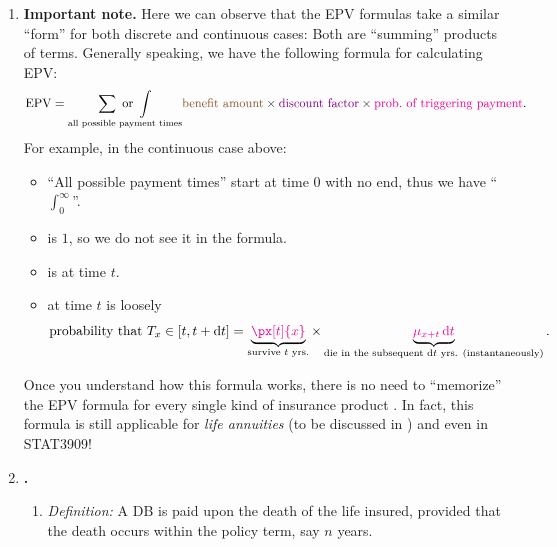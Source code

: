 \begin{enumerate}
\begin{enumerate}[label={(\arabic*)}]
\begin{center}
\begin{tabular}{lll}
\bottomrule
\end{tabular}
\end{center}
\end{enumerate}
\item \label{it:gen-epv-fmla} \ystar{} \textbf{Important note.} Here we can
observe that the EPV formulas take a similar ``form'' for both discrete and
continuous cases: Both are ``summing'' products of terms. Generally speaking,
we have the following formula for calculating EPV:
\[
\text{EPV}=\underset{\text{all possible payment times}}{\sum\text{ or }\int}\brc{\text{benefit amount}}\times\vc{\text{discount factor}}\times\mgc{\text{prob.\ of triggering payment}}.
\]
For example, in the continuous case above:
\begin{itemize}
\item ``All possible payment times'' start at time 0 with no end, thus we have
``\(\int_{0}^{\infty}\)''.
\item {} is \(1\), so we do not see it in the formula.
\item {} is  at time \(t\).
\item {} at time \(t\) is loosely
\[\text{probability that \(T_x\in [t, t+\dd{t}]\)}=\underbrace{\mgc{\px[t]{x}}}_{\text{survive \(t\) yrs.}}\times 
\underbrace{\mgc{\mu_{x+t}\dd{t}}}_{\text{die in the subsequent \(\dd{t}\) yrs. (instantaneously)}}.\]
\end{itemize}

Once you understand how this formula works, there is no need to ``memorize''
the EPV formula for every single kind of insurance product
.  In fact, this formula is still applicable for
\emph{life annuities} (to be discussed in ) and even in
STAT3909!

\item \textbf{.}
\begin{enumerate}[label={(\arabic*)}]
\item \emph{Definition:} A DB is paid upon the death of the life insured,
provided that the death occurs within the policy term, say \(n\) years.


\end{enumerate}
\end{enumerate}

